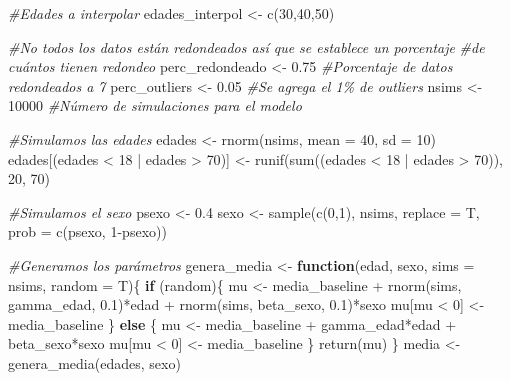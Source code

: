 \documentclass[
]{article}
\newenvironment{Shaded}{\begin{snugshade}}{\end{snugshade}}
\newcommand{\AttributeTok}[1]{\textcolor[rgb]{0.77,0.63,0.00}{#1}}
\newcommand{\CommentTok}[1]{\textcolor[rgb]{0.56,0.35,0.01}{\textit{#1}}}
\newcommand{\ControlFlowTok}[1]{\textcolor[rgb]{0.13,0.29,0.53}{\textbf{#1}}}
\newcommand{\DecValTok}[1]{\textcolor[rgb]{0.00,0.00,0.81}{#1}}
\newcommand{\FloatTok}[1]{\textcolor[rgb]{0.00,0.00,0.81}{#1}}
\newcommand{\FunctionTok}[1]{\textcolor[rgb]{0.00,0.00,0.00}{#1}}
\newcommand{\NormalTok}[1]{#1}
\newcommand{\OtherTok}[1]{\textcolor[rgb]{0.56,0.35,0.01}{#1}}
\newcommand{\SpecialCharTok}[1]{\textcolor[rgb]{0.00,0.00,0.00}{#1}}
\begin{document}
\begin{Shaded}
\begin{Highlighting}[]
\CommentTok{\#Edades a interpolar}
\NormalTok{edades\_interpol }\OtherTok{\textless{}{-}} \FunctionTok{c}\NormalTok{(}\DecValTok{30}\NormalTok{,}\DecValTok{40}\NormalTok{,}\DecValTok{50}\NormalTok{)}


\CommentTok{\#No todos los datos están redondeados así que se establece un porcentaje}
\CommentTok{\#de cuántos tienen redondeo}
\NormalTok{perc\_redondeado }\OtherTok{\textless{}{-}} \FloatTok{0.75}  \CommentTok{\#Porcentaje de datos redondeados a 7}
\NormalTok{perc\_outliers   }\OtherTok{\textless{}{-}} \FloatTok{0.05}  \CommentTok{\#Se agrega el 1\% de outliers}
\NormalTok{nsims           }\OtherTok{\textless{}{-}} \DecValTok{10000} \CommentTok{\#Número de simulaciones para el modelo}

\CommentTok{\#Simulamos las edades }
\NormalTok{edades }\OtherTok{\textless{}{-}} \FunctionTok{rnorm}\NormalTok{(nsims, }\AttributeTok{mean =} \DecValTok{40}\NormalTok{, }\AttributeTok{sd =} \DecValTok{10}\NormalTok{)}
\NormalTok{edades[(edades }\SpecialCharTok{\textless{}} \DecValTok{18} \SpecialCharTok{|}\NormalTok{ edades }\SpecialCharTok{\textgreater{}} \DecValTok{70}\NormalTok{)] }\OtherTok{\textless{}{-}} \FunctionTok{runif}\NormalTok{(}\FunctionTok{sum}\NormalTok{((edades }\SpecialCharTok{\textless{}} \DecValTok{18} \SpecialCharTok{|}\NormalTok{ edades }\SpecialCharTok{\textgreater{}} \DecValTok{70}\NormalTok{)), }\DecValTok{20}\NormalTok{, }\DecValTok{70}\NormalTok{)}

\CommentTok{\#Simulamos el sexo}
\NormalTok{psexo  }\OtherTok{\textless{}{-}} \FloatTok{0.4}
\NormalTok{sexo   }\OtherTok{\textless{}{-}} \FunctionTok{sample}\NormalTok{(}\FunctionTok{c}\NormalTok{(}\DecValTok{0}\NormalTok{,}\DecValTok{1}\NormalTok{), nsims, }\AttributeTok{replace =}\NormalTok{ T, }\AttributeTok{prob =} \FunctionTok{c}\NormalTok{(psexo, }\DecValTok{1}\SpecialCharTok{{-}}\NormalTok{psexo))}

\CommentTok{\#Generamos los parámetros}
\NormalTok{genera\_media }\OtherTok{\textless{}{-}} \ControlFlowTok{function}\NormalTok{(edad, sexo, }\AttributeTok{sims =}\NormalTok{ nsims, }\AttributeTok{random =}\NormalTok{ T)\{}
  \ControlFlowTok{if}\NormalTok{ (random)\{}
\NormalTok{    mu }\OtherTok{\textless{}{-}}\NormalTok{ media\_baseline }\SpecialCharTok{+} \FunctionTok{rnorm}\NormalTok{(sims, gamma\_edad, }\FloatTok{0.1}\NormalTok{)}\SpecialCharTok{*}\NormalTok{edad }\SpecialCharTok{+} \FunctionTok{rnorm}\NormalTok{(sims, beta\_sexo, }\FloatTok{0.1}\NormalTok{)}\SpecialCharTok{*}\NormalTok{sexo}
\NormalTok{    mu[mu }\SpecialCharTok{\textless{}} \DecValTok{0}\NormalTok{] }\OtherTok{\textless{}{-}}\NormalTok{ media\_baseline}
\NormalTok{  \} }\ControlFlowTok{else}\NormalTok{ \{}
\NormalTok{    mu }\OtherTok{\textless{}{-}}\NormalTok{ media\_baseline }\SpecialCharTok{+}\NormalTok{ gamma\_edad}\SpecialCharTok{*}\NormalTok{edad }\SpecialCharTok{+}\NormalTok{ beta\_sexo}\SpecialCharTok{*}\NormalTok{sexo}
\NormalTok{    mu[mu }\SpecialCharTok{\textless{}} \DecValTok{0}\NormalTok{] }\OtherTok{\textless{}{-}}\NormalTok{ media\_baseline}
\NormalTok{  \}}
  \FunctionTok{return}\NormalTok{(mu)}
\NormalTok{\}}
\NormalTok{media }\OtherTok{\textless{}{-}} \FunctionTok{genera\_media}\NormalTok{(edades, sexo)}


\end{Highlighting}
\end{Shaded}
\end{document}

